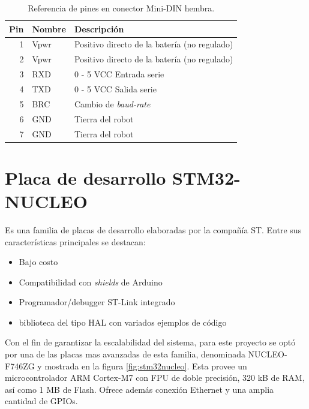 \begin{table}[h]
    \centering
    \caption{Referencia de pines en conector Mini-DIN hembra.}
    \label{tab:Pines}
    \begin{tabular}{rll}
        \toprule
        \multicolumn{1}{l}{Pin} & Nombre & Descripción                                  \\
        \midrule
        1                       & Vpwr   & Positivo directo de la batería (no regulado) \\
        2                       & Vpwr   & Positivo directo de la batería (no regulado) \\
        3                       & RXD    & 0 - 5 VCC Entrada serie                      \\
        4                       & TXD    & 0 - 5 VCC Salida serie                       \\
        5                       & BRC    & Cambio de \textit{baud-rate}                 \\
        6                       & GND    & Tierra del robot                             \\
        7                       & GND    & Tierra del robot                             \\
        \bottomrule
    \end{tabular}
\end{table}

\section{Placa de desarrollo STM32-NUCLEO}

Es una familia de placas de desarrollo elaboradas por la compañía ST. Entre sus características principales se destacan:

\begin{itemize}
    \item Bajo costo
    \item Compatibilidad con \textit{shields} de Arduino
    \item Programador/debugger ST-Link integrado
    \item biblioteca del tipo HAL con variados ejemplos de código
\end{itemize}

Con el fin de garantizar la escalabilidad del sistema, para este proyecto se optó por una de las placas mas avanzadas de esta familia, denominada NUCLEO-F746ZG y mostrada en la figura \ref{fig:stm32nucleo}. Esta provee un microcontrolador ARM Cortex-M7 con FPU de doble precisión, 320 kB de RAM, así como 1 MB de Flash. Ofrece además conexión Ethernet y una amplia cantidad de GPIOs.

